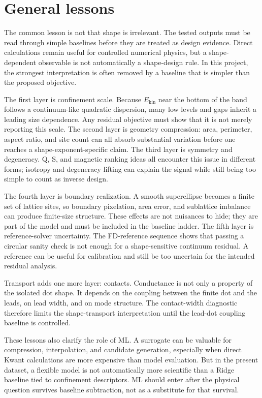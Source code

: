 \section{General lessons}

The common lesson is not that shape is irrelevant. The tested outputs must be
read through simple baselines before they are treated as design evidence. Direct
calculations remain useful for controlled numerical physics, but a
shape-dependent observable is not automatically a shape-design rule. In this
project, the strongest interpretation is often removed by a baseline that is
simpler than the proposed objective.

The first layer is confinement scale. Because $E_{\mathrm{kin}}$ near the
bottom of the band follows a continuum-like quadratic dispersion, many low
levels and gaps inherit a leading size dependence. Any residual objective must
show that it is not merely reporting this scale. The second layer is geometry
compression: area, perimeter, aspect ratio, and site count can all absorb
substantial variation before one reaches a shape-exponent-specific claim. The
third layer is symmetry and degeneracy. Q, S, and magnetic ranking ideas all
encounter this issue in different forms; isotropy and degeneracy lifting can
explain the signal while still being too simple to count as inverse design.

The fourth layer is boundary realization. A smooth superellipse becomes a
finite set of lattice sites, so boundary pixelation, area error, and sublattice
imbalance can produce finite-size structure. These effects are not nuisances to
hide; they are part of the model and must be included in the baseline ladder.
The fifth layer is reference-solver uncertainty. The FD-reference sequence shows
that passing a circular sanity check is not enough for a shape-sensitive
continuum residual. A reference can be useful for calibration and still be too
uncertain for the intended residual analysis.

Transport adds one more layer: contacts. Conductance is not only a property of
the isolated dot shape. It depends on the coupling between the finite dot and
the leads, on lead width, and on mode structure. The contact-width diagnostic
therefore limits the shape-transport interpretation until the lead-dot coupling
baseline is controlled.

These lessons also clarify the role of ML. A surrogate can be valuable for
compression, interpolation, and candidate generation, especially when direct
Kwant calculations are more expensive than model evaluation. But in the present
dataset, a flexible model is not automatically more scientific than a Ridge
baseline tied to confinement descriptors. ML should enter after the physical
question survives baseline subtraction, not as a substitute for that survival.

